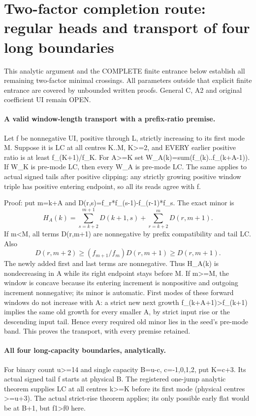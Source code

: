 \section{Two-factor completion route: regular heads and transport of four long boundaries}
This analytic argument and the COMPLETE finite entrance below establish
all remaining two-factor minimal crossings. All parameters outside that
explicit finite entrance are covered by unbounded written proofs.
General C, A2 and original coefficient UI remain OPEN.

\paragraph{A valid window-length transport with a prefix-ratio premise.}
Let f be nonnegative UI, positive through L, strictly increasing to
its first mode M. Suppose it is LC at all centres K..M, K>=2,
and EVERY earlier positive ratio is at least f_(K+1)/f_K.
For A>=K set W_A(k)=sum(f_(k)..f_(k+A-1)). If W_K is pre-mode LC,
then every W_A is pre-mode LC. The same applies to actual signed
tails after positive clipping: any strictly growing positive window
triple has positive entering endpoint, so all its reads agree with f.

Proof: put m=k+A and D(r,s)=f_r*f_(s-1)-f_(r-1)*f_s. The exact minor is
\[
 H_A(k)=\sum_{s=k+2}^{m+1}D(k+1,s)
             +\sum_{r=k+2}^{m}D(r,m+1).
\]
If m<M, all terms D(r,m+1) are nonnegative by prefix compatibility
and tail LC. Also
\[
 D(r,m+2)\ge(f_{m+1}/f_m)D(r,m+1)\ge D(r,m+1).
\]
The newly added first and last terms are nonnegative. Thus H_A(k)
is nondecreasing in A while its right endpoint stays before M.
If m>=M, the window is concave because its entering increment is
nonpositive and outgoing increment nonnegative; its minor is automatic.
First modes of these forward windows do not increase with A: a strict
new next growth f_(k+A+1)>f_(k+1) implies the same old growth for
every smaller A, by strict input rise or the descending input tail.
Hence every required old minor lies in the seed's pre-mode band.
This proves the transport, with every premise retained.

\paragraph{All four long-capacity boundaries, analytically.}
For binary count u>=14 and single capacity B=u-c, c=-1,0,1,2,
put K=c+3. Its actual signed tail f starts at physical B.
The registered one-jump analytic theorem supplies LC at all centres
k>=K before its first mode (physical centres >=u+3).
The actual strict-rise theorem applies; its only possible early flat
would be at B+1, but f1>f0 here.


